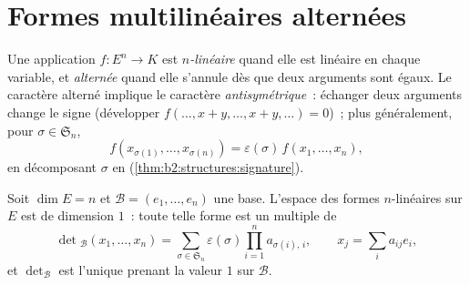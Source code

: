 \section{Formes multilinéaires alternées}

\begin{definition}\label{def:b2:linalg:alternating}
Une application $f \colon E^n \to K$ est \emph{$n$-linéaire} quand elle
est linéaire en chaque variable, et \emph{alternée}
quand elle s'annule dès que deux arguments sont égaux. Le caractère
alterné implique le caractère \emph{antisymétrique}~: échanger deux
arguments change le signe (développer $f(\dots, x + y, \dots, x + y,
\dots) = 0$)~; plus généralement, pour $\sigma \in \mathfrak{S}_n$,
\[
f(x_{\sigma(1)}, \dots, x_{\sigma(n)}) =
\varepsilon(\sigma)\, f(x_1, \dots, x_n),
\]
en décomposant $\sigma$ en 
(\cref{thm:b2:structures:signature}).
\end{definition}

\begin{theorem}\label{thm:b2:linalg:detspace}
Soit $\dim E = n$ et $\mathcal{B} = (e_1, \dots, e_n)$ une base.
L'espace des formes $n$-linéaires  sur $E$ est de dimension
$1$~: toute telle forme est un multiple de
\[
\det{}_{\mathcal{B}}(x_1, \dots, x_n)
= \sum_{\sigma \in \mathfrak{S}_n} \varepsilon(\sigma)
\prod_{i=1}^{n} a_{\sigma(i),\,i},
\qquad
x_j = \sum_{i} a_{ij} e_i ,
\]
et $\det_{\mathcal{B}}$ est l'unique prenant la valeur $1$ sur
$\mathcal{B}$.
\end{theorem}

